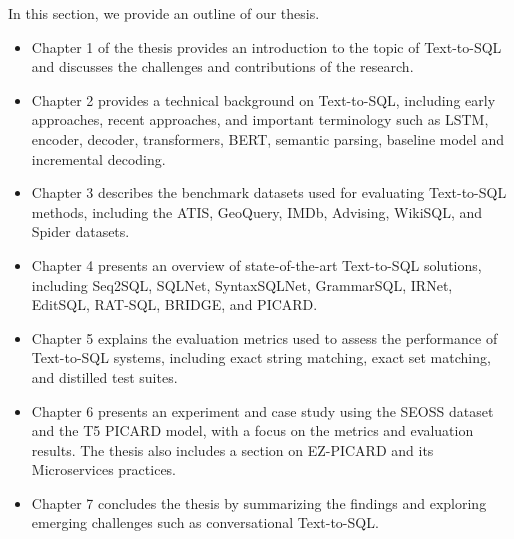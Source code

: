 In this section, we provide an outline of our thesis.

\begin{itemize}
      \item Chapter 1 of the thesis provides an introduction to the topic of Text-to-SQL and discusses the challenges and contributions of the research.
      \item Chapter 2 provides a technical background on Text-to-SQL, including early approaches, recent approaches, and important terminology such as LSTM, encoder, decoder, transformers, BERT, semantic parsing, baseline model and incremental decoding.
      \item Chapter 3 describes the benchmark datasets used for evaluating Text-to-SQL methods, including the ATIS, GeoQuery, IMDb, Advising, WikiSQL, and Spider datasets.
      \item Chapter 4 presents an overview of state-of-the-art Text-to-SQL solutions, including Seq2SQL, SQLNet, SyntaxSQLNet, GrammarSQL, IRNet, EditSQL, RAT-SQL, BRIDGE, and PICARD.
      \item Chapter 5 explains the evaluation metrics used to assess the performance of Text-to-SQL systems, including exact string matching, exact set matching, and distilled test suites.
      \item Chapter 6 presents an experiment and case study using the SEOSS dataset and the T5 PICARD model, with a focus on the metrics and evaluation results. The thesis also includes a section on EZ-PICARD and its Microservices practices.
      \item Chapter 7 concludes the thesis by summarizing the findings and exploring emerging challenges such as conversational Text-to-SQL.
\end{itemize}
